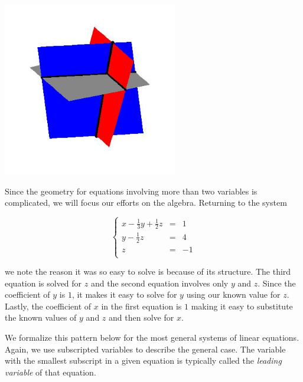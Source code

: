 \centerline{\includegraphics[width=3in]{./LinSystemsGraphics/3planes01.jpg}}

Since the geometry for equations involving more than two variables is complicated, we will focus our efforts on the algebra.  Returning to the system 

\[ \left\{ \begin{array}{rcr} x-\frac{1}{3}y+\frac{1}{2}z  & = & 1 \\ [3pt]
y - \frac{1}{2} z & = & 4 \\ [3pt]
z & = & -1 \\ \end{array} \right.\] 

we note the reason it was so easy to solve is because of its structure.  The third equation is solved for $z$ and the second equation involves only $y$ and $z$. Since the coefficient of $y$ is $1$, it makes it easy to solve for $y$ using our known value for $z$.  Lastly, the coefficient of  $x$ in the first equation is $1$ making it easy to substitute the known values of $y$ and $z$ and then solve for $x$.  

We formalize this pattern below for the most general systems of linear equations.  Again, we use subscripted variables to describe the general case.  The variable with the smallest subscript in a given equation is typically called the  \textit{leading variable} of that equation.


